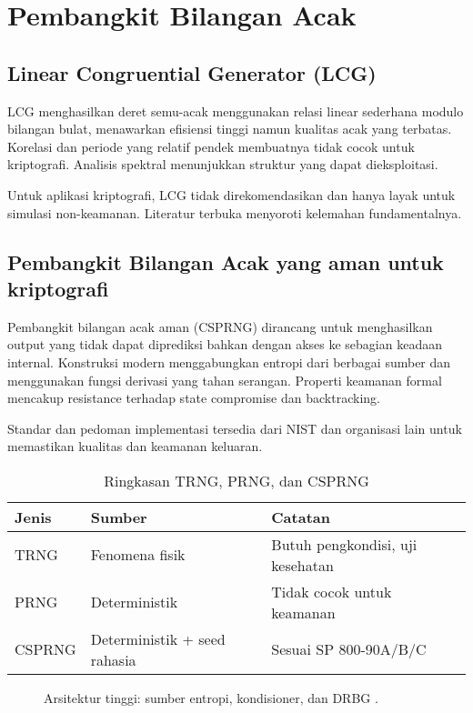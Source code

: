 \documentclass[../main.tex]{subfiles}
\begin{document}
\chapter{Pembangkit Bilangan Acak}

\section{Linear Congruential Generator (LCG)}
LCG menghasilkan deret semu-acak menggunakan relasi linear sederhana modulo bilangan bulat, menawarkan efisiensi tinggi namun kualitas acak yang terbatas. Korelasi dan periode yang relatif pendek membuatnya tidak cocok untuk kriptografi. Analisis spektral menunjukkan struktur yang dapat dieksploitasi.

Untuk aplikasi kriptografi, LCG tidak direkomendasikan dan hanya layak untuk simulasi non-keamanan. Literatur terbuka menyoroti kelemahan fundamentalnya.

\section{Pembangkit Bilangan Acak yang aman untuk kriptografi}
Pembangkit bilangan acak aman (CSPRNG) dirancang untuk menghasilkan output yang tidak dapat diprediksi bahkan dengan akses ke sebagian keadaan internal. Konstruksi modern menggabungkan entropi dari berbagai sumber dan menggunakan fungsi derivasi yang tahan serangan. Properti keamanan formal mencakup resistance terhadap state compromise dan backtracking.

Standar dan pedoman implementasi tersedia dari NIST dan organisasi lain untuk memastikan kualitas dan keamanan keluaran.

\begin{table}[h]
\centering
\caption{Ringkasan TRNG, PRNG, dan CSPRNG}
\label{tab:rng}
\begin{tabular}{lll}
\toprule
Jenis & Sumber & Catatan \\
\midrule
TRNG & Fenomena fisik & Butuh pengkondisi, uji kesehatan \parencite{nist80090b} \\
PRNG & Deterministik & Tidak cocok untuk keamanan \\
CSPRNG & Deterministik + seed rahasia & Sesuai SP 800-90A/B/C \parencite{nist80090a,nist80090c} \\
\bottomrule
\end{tabular}
\end{table}

\begin{figure}[h]
\centering
{}
\caption{Arsitektur tinggi: sumber entropi, kondisioner, dan DRBG \parencite{nist80090a,nist80090b,nist80090c}.}
\label{fig:drbg}
\end{figure}
\end{document}
